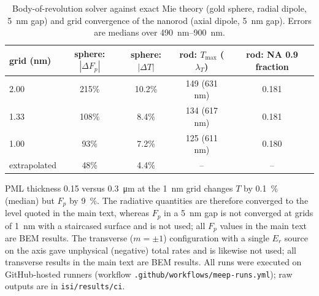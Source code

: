 \documentclass[11pt,a4paper]{article}
\begin{document}
\begin{table}[h]\centering
\caption{Body-of-revolution solver against exact Mie theory (gold sphere, radial dipole, \SI{5}{nm} gap) and grid
convergence of the nanorod (axial dipole, \SI{5}{nm} gap). Errors are medians over \SIrange{490}{900}{nm}.}\label{tab:bor}
\begin{tabular}{lcccc}\toprule
grid (nm) & sphere: $|\Delta F_p|$ & sphere: $|\Delta T|$ & rod: $T_{\max}$ ($\lambda_T$) & rod: NA 0.9 fraction\\\midrule
2.00 & 215\% & 10.2\% & 149 (631 nm) & 0.181\\
1.33 & 108\% & 8.4\% & 134 (617 nm) & 0.181\\
1.00 & 93\% & 7.2\% & 125 (611 nm) & 0.180\\
extrapolated & 48\% & 4.4\% & -- & --\\\bottomrule
\end{tabular}\end{table}

PML thickness 0.15 versus \SI{0.3}{\micro\metre} at the \SI{1}{nm} grid changes $T$ by \SI{0.1}{\percent} (median)
but $F_p$ by \SI{9}{\percent}. The radiative quantities are therefore converged to the level quoted in the main text,
whereas $F_p$ in a \SI{5}{nm} gap is not converged at grids of \SI{1}{nm} with a staircased surface and is not used; all $F_p$ values in the main text are BEM results.
The transverse ($m=\pm1$) configuration with a single $E_r$ source on the axis gave unphysical (negative) total
rates and is likewise not used; all transverse results in the main text are BEM results. All runs were
executed on GitHub-hosted runners (workflow \texttt{.github/workflows/meep-runs.yml}); raw outputs are in
\texttt{isi/results/ci}.
\end{document}
